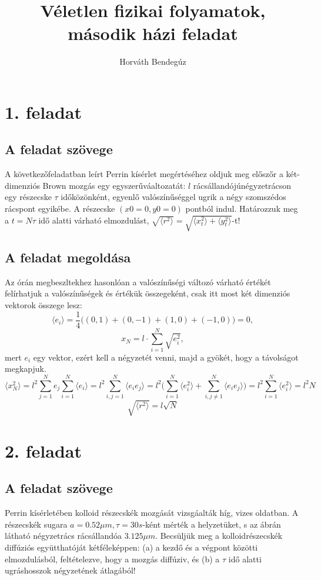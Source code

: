 \documentclass[12pt]{article}
\title{Véletlen fizikai folyamatok, második házi feladat}
\author{Horváth Bendegúz}
\begin{document}
\maketitle



\section*{1. feladat}

\subsection*{ A feladat szövege} A következőfeladatban leírt Perrin kísérlet megértéséhez oldjuk meg előszőr a két-dimenziós Brown mozgás
egy egyszerűváaltozatát: $l$ rácsállandójúnégyzetrácson egy részecske $\tau$ időközönként, egyenlő valószínűséggel ugrik a négy szomszédos rácspont egyikébe. A részecske $ (x0 = 0, y0 = 0)$ pontból indul.
Határozzuk meg a $t = N\tau $ idő alatti várható elmozdulást,  $\sqrt{\langle r^2 \rangle }= \sqrt{\langle x^2_t \rangle+ \langle y^2_t\rangle}$-t!

 
\subsection*{A feladat megoldása} Az órán megbeszltekhez hasonlóan a valószínűségi változó várható értékét felírhatjuk a valószínűségek és értékük összegeként, csak itt most két dimenziós vektorok összege lesz:
$$\langle e_i \rangle = \frac{1}{4}\big ( (0, 1)+(0,-1)+(1,0)+(-1,0)\big ) =0, $$
$$ x_N = l\cdot \sum_{i=1}^N\sqrt{e^2_i},$$
mert $e_i$ egy vektor, ezért kell a négyzetét venni, majd a gyökét, hogy a távolságot megkapjuk.
$$\langle x^2_N\rangle = l^2\sum_{j=1}^Ne_j\sum_{i=1}^N \langle e_i \rangle = l^2\sum_{i,j=1}^N \langle e_i e_j\rangle = l^2 \Big (\sum_{i=1}^N \langle e^2_i \rangle +\sum_{i,j \neq 1}^N\langle e_i e_j \rangle \Big ) = l^2 \sum_{i=1}^N \langle e^2_i \rangle = {l^2N}$$
$$\sqrt{\langle r^2 \rangle} = l\sqrt{N} $$
 
\newpage
\section*{2. feladat}

\subsection*{ A feladat szövege}
Perrin kísérletében kolloid részecskék mozgását vizsgáalták híg, vizes oldatban. A részecskék sugara
$a = 0.52\mu m, \tau = 30s$-ként mérték a helyzetüket, s az ábrán látható négyzetrács rácsállandóa $3.125\mu m$. Becsüljük meg a kolloidrészecskék diffúziós együtthatóját kétféleképpen: (a) a kezdő és a végpont közötti elmozdulásból, feltételezve, hogy a mozgás diffúziv, és (b) a $\tau$ idő alatti ugráshosszok négyzetének átlagából!
\end{document}
